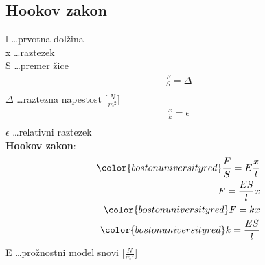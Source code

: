 {\color{indiagreen}\subsection{Hookov zakon}}
l \dots prvotna dolžina\\
x \dots raztezek\\
S \dots premer žice\\
\begin{align*}
	\frac{F}{S} = \Delta\\
\end{align*}
$\Delta$ \dots raztezna napestost [$\frac{N}{m^2}$]\\
\begin{align*}
	\frac{x}{k} = \epsilon\\
\end{align*}
$\epsilon$ \dots relativni raztezek\\
\textbf{Hookov zakon}:
\begin{align*}
	{\color{bostonuniversityred}\frac{F}{S} = E\frac{x}{l}}\\
	F = \frac{ES}{l}x\\
	{\color{bostonuniversityred}F = kx}\\
	{\color{bostonuniversityred}k = \frac{ES}{l}}\\ 
\end{align*}
E \dots prožnostni model snovi [$\frac{N}{m^2}$]


